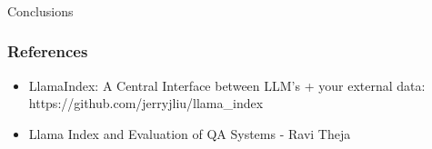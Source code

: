 \begin{frame}[fragile]\frametitle{}
\begin{center}
{\Large Conclusions}
\end{center}
\end{frame}

\begin{frame}[fragile]\frametitle{References}


\begin{itemize}
\item LlamaIndex: A Central Interface between LLM’s + your external data: https://github.com/jerryjliu/llama\_index
\item Llama Index and Evaluation of QA Systems - Ravi Theja

\end{itemize}


\end{frame}